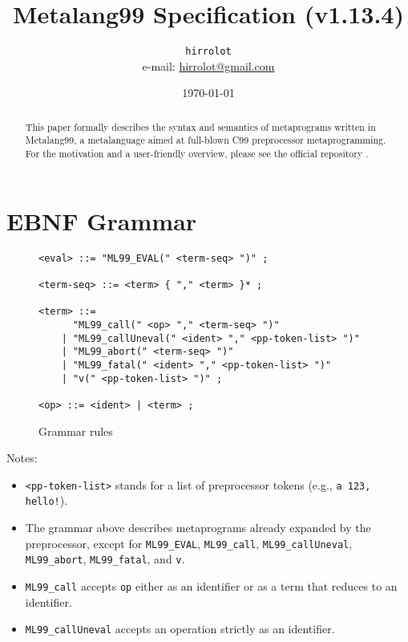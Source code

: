 \documentclass[12pt]{article}
\theoremstyle{break}
\begin{document}
\title{Metalang99 Specification (v1.13.4)}
\date{\today}
\author{\texttt{hirrolot} \\ e-mail: \href{mailto:hirrolot@gmail.com}{hirrolot@gmail.com}}
\maketitle

\begin{abstract}
This paper formally describes the syntax and semantics of metaprograms written in Metalang99,
a metalanguage aimed at full-blown C99 preprocessor metaprogramming. For the motivation and
a user-friendly overview, please see the official repository \cite{Metalang99}.
\end{abstract}

\tableofcontents

\newpage

\section{EBNF Grammar}

\begin{figure}[H]
    \caption{Grammar rules}

\begin{verbatim}
<eval> ::= "ML99_EVAL(" <term-seq> ")" ;

<term-seq> ::= <term> { "," <term> }* ;

<term> ::=
      "ML99_call(" <op> "," <term-seq> ")"
    | "ML99_callUneval(" <ident> "," <pp-token-list> ")"
    | "ML99_abort(" <term-seq> ")"
    | "ML99_fatal(" <ident> "," <pp-token-list> ")"
    | "v(" <pp-token-list> ")" ;

<op> ::= <ident> | <term> ;
\end{verbatim}

\end{figure}

Notes:

\begin{itemize}
    \item \texttt{<pp-token-list>} stands for a list of preprocessor tokens (e.g., \texttt{a 123, hello!}).
    \item The grammar above describes metaprograms already expanded by the preprocessor,
    except for \texttt{ML99\_EVAL}, \texttt{ML99\_call}, \texttt{ML99\_callUneval}, \\
    \texttt{ML99\_abort}, \texttt{ML99\_fatal}, and \texttt{v}.
    \item \texttt{ML99\_call} accepts \texttt{op} either as an identifier or as a term that
    reduces to an identifier.
    \item \texttt{ML99\_callUneval} accepts an operation strictly as an identifier.
\end{itemize}
\end{document}
